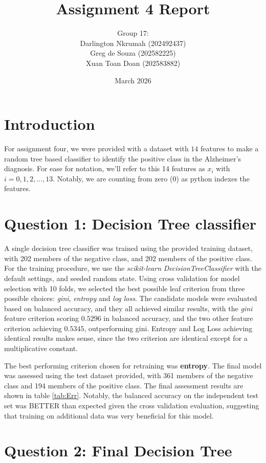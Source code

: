 \documentclass{article}
\title{Assignment 4 Report}
\author{Group 17: \\ Darlington Nkrumah (202492437) \\
  Greg de Souza (202582225) \\
  Xuan Toan Doan (202583882)}
\date{March 2026}
\begin{document}
\maketitle

\section*{Introduction}

For assignment four, we were provided with a dataset with $14$ features to make a
random tree based classifier to identify the positive class in the Alzheimer's diagnosis. For ease
for notation, we'll refer to this 14 features as $x_i$ with $i=0,1,2,...,13$. Notably, we are counting
from zero (0) as python indexes the features.

  \section*{Question 1: Decision Tree classifier}
  
  A single decision tree classifier was trained using the provided training dataset,
  with 202 members of the negative class, and 202 members of the positive class. For
  the training procedure, we use the \textit{scikit-learn} \textit{DecisionTreeClassifier} with the
  default settings, and seeded random state. Using cross validation for model selection with 10 folds,
  we selected the best possible leaf criterion from three possible choices: \textit{gini},
  \textit{entropy} and \textit{log loss}. The candidate models were evaluated based on balanced accuracy,
  and they all achieved similar results, with the \textit{gini} feature criterion scoring $0.5296$ in
  balanced accuracy, and the two other feature criterion achieving $0.5345$, outperforming gini.
  Entropy and Log Loss achieving identical results makes sense, since the two criterion are identical
  except for a multiplicative constant. 

  The best performing criterion chosen for retraining was \textbf{entropy}. The final model was assessed
  using the test dataset provided, with 361 members of the negative class
  and 194 members of the positive class. The final assessment results are shown in table
  \ref{tab:Err}.
  Notably, the balanced accuracy on the independent test set was BETTER than expected given
  the cross validation evaluation,
  suggesting that training on additional data was very beneficial for this model.
  
  
  \section*{Question 2: Final Decision Tree}
\end{document}
